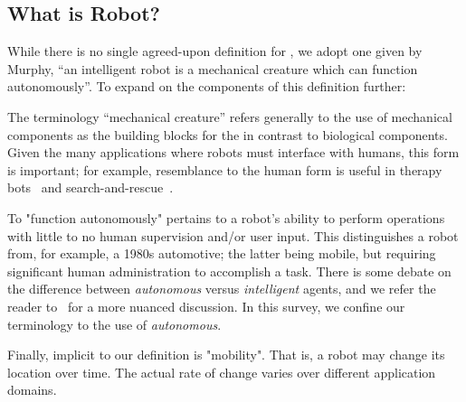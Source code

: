 \subsection{What is Robot?}

While there is no single agreed-upon definition for , we adopt one given by Murphy, ``an intelligent robot is a mechanical creature which can function autonomously''. To expand on the components of this definition further:





The terminology ``mechanical creature'' refers generally to the use of mechanical components as the building blocks for the  in contrast to biological components. Given the many applications where robots must interface with humans, this form is important; for example, resemblance to the human form is useful in therapy bots~\cite{} and search-and-rescue~\cite{Shin2017}. 

To "function autonomously" pertains to a robot's ability to perform operations with little to no human supervision and/or user input. This distinguishes a robot from, for example, a 1980s automotive; the latter being mobile, but requiring significant human administration to accomplish a task. There is some debate on the difference between {\it autonomous} versus {\it intelligent} agents, and we refer the reader to~\cite{} for a more nuanced discussion. In this survey, we confine our terminology to the use of {\it autonomous}.

Finally, implicit to our definition is "mobility". That is, a robot may change its location over time. The actual rate of change varies over different application domains. 



